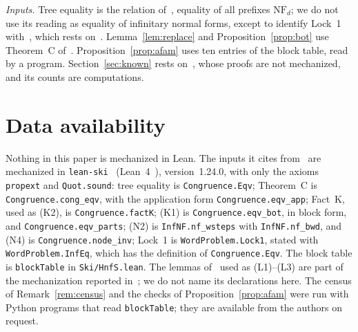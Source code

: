 \documentclass[11pt]{amsart}
\theoremstyle{definition}
\newcommand{\NF}{\mathrm{NF}}
\begin{document}
\emph{Inputs.} Tree equality is the relation of~\citep[Definition~1]{s13}, equality of all prefixes
$\NF_d$; we do not use its reading as equality of infinitary normal forms, except to identify
Lock~1 with~\citep[Conjecture~11]{s6}, which rests on~\citep{s3}. Lemma~\ref{lem:replace} and
Proposition~\ref{prop:bot} use Theorem~C of~\citep{s13}. Proposition~\ref{prop:afam} uses ten entries
of the block table, read by a program. Section~\ref{sec:known} rests on~\citep{s12}, whose proofs are
not mechanized, and its counts are computations.

\section*{Data availability}
\sloppy
Nothing in this paper is mechanized in Lean. The inputs it cites from~\citep{s13} are mechanized in
\texttt{lean-ski}~\citep{leanski} (Lean~4~\citep{lean4}), version~1.24.0, with only the axioms
\texttt{propext} and \texttt{Quot.sound}: tree equality is \texttt{Congruence.Eqv}; Theorem~C is
\texttt{Congruence.cong\_eqv}, with the application form \texttt{Congruence.eqv\_app}; Fact~K, used
as (K2), is \texttt{Congruence.factK}; (K1) is \texttt{Congruence.eqv\_bot}, in block form, and
\texttt{Congruence.eqv\_parts}; (N2) is \texttt{InfNF.nf\_wsteps} with \texttt{InfNF.nf\_bwd}, and
(N4) is \texttt{Congruence.node\_inv}; Lock~1 is \texttt{WordProblem.Lock1}, stated with
\texttt{WordProblem.InfEq}, which has the definition of \texttt{Congruence.Eqv}. The block table is
\texttt{blockTable} in \texttt{Ski/HnfS.lean}. The lemmas of~\citep{s11} used as (L1)--(L3) are
part of the mechanization reported in~\citep{s11}; we do not name its declarations here. The census
of Remark~\ref{rem:census} and the checks of Proposition~\ref{prop:afam} were run with Python
programs that read \texttt{blockTable}; they are available from the authors on request.



\end{document}
